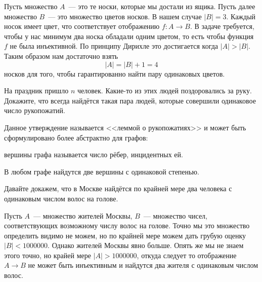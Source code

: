 Пусть множество $A$~--- это те носки, которые мы достали из ящика. Пусть далее множество $B$~--- это множество цветов носков. В нашем случае $|B|=3$. Каждый носок имеет цвет, что соответствует отображению $f:A\to B$. В задаче требуется, чтобы у нас минимум два носка обладали одним цветом, то есть чтобы функция $f$ не была инъективной. По принципу Дирихле это достигается когда $|A|>|B|$. Таким образом нам достаточно взять $$|A|=|B|+1 = 4$$ носков для того, чтобы гарантированно найти пару одинаковых цветов.

\begin{exercise}
На праздник пришло $n$ человек. Какие-то из этих людей поздоровались за руку. Докажите, что всегда найдётся такая пара людей, которые совершили одинаковое число рукопожатий.
\end{exercise}

Данное утверждение называется <<леммой о рукопожатиях>> и может быть сформулировано более абстрактно для графов:

\begin{definition}
 вершины графа называется число рёбер, инцидентных ей.
\end{definition}

\begin{HandshakesLemma}
В любом графе найдутся две вершины с одинаковой степенью.
\end{HandshakesLemma}

\begin{example}
Давайте докажем, что в Москве найдётся по крайней мере два человека с одинаковым числом волос на голове.

Пусть $A$~--- множество жителей Москвы, $B$~--- множество чисел, соответствующих возможному числу волос на голове. Точно мы это множество определить видимо не можем, но по крайней мере можем дать грубую оценку $|B|<1000000$. Однако жителей Москвы явно больше. Опять же мы не знаем этого точно, но крайей мере $|A|>1000000$, откуда следует то отображение $A\to B$ не может быть инъективным и найдутся два жителя с одинаковым числом волос.
\end{example}

